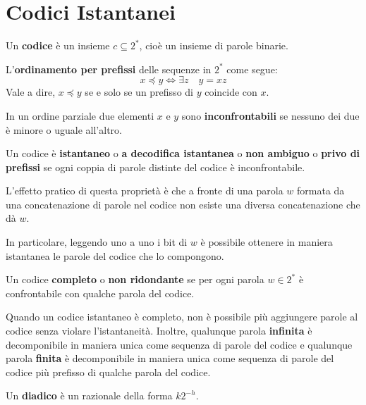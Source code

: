 \documentclass[\main/main.tex]{subfiles}
\begin{document}
\chapter{Codici Istantanei}
\begin{multicols}{2}
\begin{definition}[Codice]
    Un \textbf{codice} è un insieme \(c \subseteq 2^*\), cioè un insieme di parole binarie. 
\end{definition}
\begin{definition}
    L'\textbf{ordinamento per prefissi} delle sequenze in \(2^*\) come segue:
    \[
        x \preceq y \Longleftrightarrow \exists z \quad y=x z
    \]
    Vale a dire, \(x \preceq y\) se e solo se un prefisso di \(y\) coincide con \(x\).
\end{definition}
\begin{observation}
    In un ordine parziale due elementi \(x\) e \(y\) sono \textbf{inconfrontabili} se nessuno dei due è minore o uguale all'altro.
\end{observation}
\begin{definition}
    Un codice è \textbf{istantaneo} o \textbf{a decodifica istantanea} o \textbf{non ambiguo} o \textbf{privo di prefissi} se ogni coppia di parole distinte del codice è inconfrontabile.
\end{definition}
\begin{observation}
    L'effetto pratico di questa proprietà è che a fronte di una parola \(w\) formata da una concatenazione di parole nel codice non esiste una diversa concatenazione che dà \(w\). 
    
    In particolare, leggendo uno a uno i bit di \(w\) è possibile ottenere in maniera istantanea le parole del codice che lo compongono.
\end{observation}
\begin{definition}
    Un codice \textbf{completo} o \textbf{non ridondante} se per ogni parola \(w \in 2^*\) è confrontabile con qualche parola del codice. 
    
    Quando un codice istantaneo è completo, non è possibile più aggiungere parole al codice senza violare l'istantaneità. Inoltre, qualunque parola \textbf{infinita} è decomponibile in maniera unica come sequenza di parole del codice e qualunque parola \textbf{finita} è decomponibile in maniera unica come sequenza di parole del codice più prefisso di qualche parola del codice.
\end{definition}
\begin{definition}[Diadico]
    Un \textbf{diadico} è un razionale della forma \(k2^{-h}\).
\end{definition}
\end{multicols}
\clearpage
\end{document}
